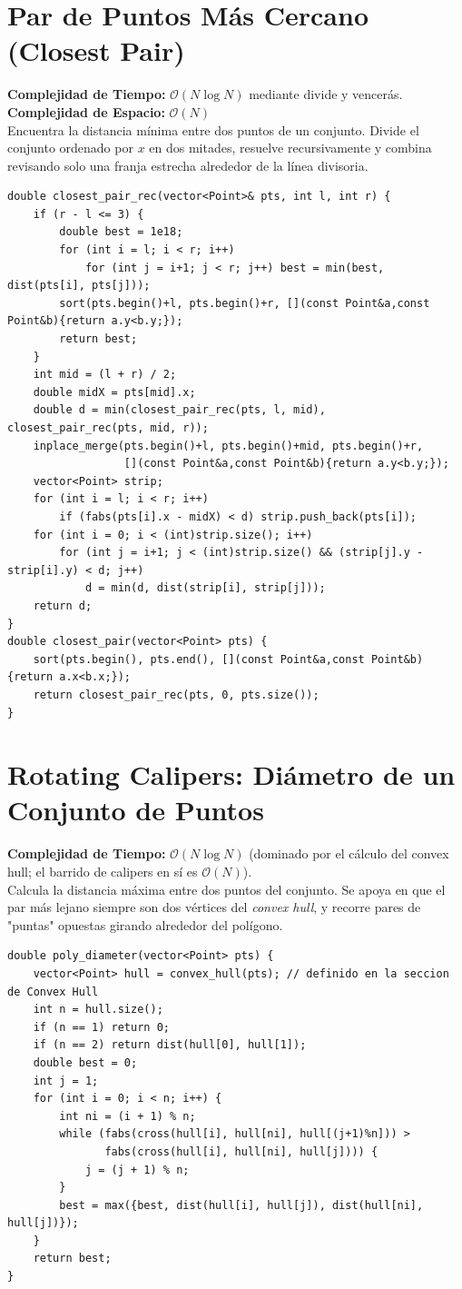 \documentclass[10pt,twocolumn,letterpaper]{report}
\begin{document}
\section{Par de Puntos Más Cercano (Closest Pair)}
\textbf{Complejidad de Tiempo:} $\mathcal{O}(N \log N)$ mediante divide y vencerás. \\
\textbf{Complejidad de Espacio:} $\mathcal{O}(N)$ \\
Encuentra la distancia mínima entre dos puntos de un conjunto. Divide el conjunto ordenado por $x$ en dos mitades, resuelve recursivamente y combina revisando solo una franja estrecha alrededor de la línea divisoria.
\begin{lstlisting}
double closest_pair_rec(vector<Point>& pts, int l, int r) {
    if (r - l <= 3) {
        double best = 1e18;
        for (int i = l; i < r; i++)
            for (int j = i+1; j < r; j++) best = min(best, dist(pts[i], pts[j]));
        sort(pts.begin()+l, pts.begin()+r, [](const Point&a,const Point&b){return a.y<b.y;});
        return best;
    }
    int mid = (l + r) / 2;
    double midX = pts[mid].x;
    double d = min(closest_pair_rec(pts, l, mid), closest_pair_rec(pts, mid, r));
    inplace_merge(pts.begin()+l, pts.begin()+mid, pts.begin()+r,
                  [](const Point&a,const Point&b){return a.y<b.y;});
    vector<Point> strip;
    for (int i = l; i < r; i++)
        if (fabs(pts[i].x - midX) < d) strip.push_back(pts[i]);
    for (int i = 0; i < (int)strip.size(); i++)
        for (int j = i+1; j < (int)strip.size() && (strip[j].y - strip[i].y) < d; j++)
            d = min(d, dist(strip[i], strip[j]));
    return d;
}
double closest_pair(vector<Point> pts) {
    sort(pts.begin(), pts.end(), [](const Point&a,const Point&b){return a.x<b.x;});
    return closest_pair_rec(pts, 0, pts.size());
}
\end{lstlisting}
\section{Rotating Calipers: Diámetro de un Conjunto de Puntos}
\textbf{Complejidad de Tiempo:} $\mathcal{O}(N \log N)$ (dominado por el cálculo del convex hull; el barrido de calipers en sí es $\mathcal{O}(N)$). \\
Calcula la distancia máxima entre dos puntos del conjunto. Se apoya en que el par más lejano siempre son dos vértices del \textit{convex hull}, y recorre pares de "puntas" opuestas girando alrededor del polígono.
\begin{lstlisting}
double poly_diameter(vector<Point> pts) {
    vector<Point> hull = convex_hull(pts); // definido en la seccion de Convex Hull
    int n = hull.size();
    if (n == 1) return 0;
    if (n == 2) return dist(hull[0], hull[1]);
    double best = 0;
    int j = 1;
    for (int i = 0; i < n; i++) {
        int ni = (i + 1) % n;
        while (fabs(cross(hull[i], hull[ni], hull[(j+1)%n])) >
               fabs(cross(hull[i], hull[ni], hull[j]))) {
            j = (j + 1) % n;
        }
        best = max({best, dist(hull[i], hull[j]), dist(hull[ni], hull[j])});
    }
    return best;
}
\end{lstlisting}
\end{document}

